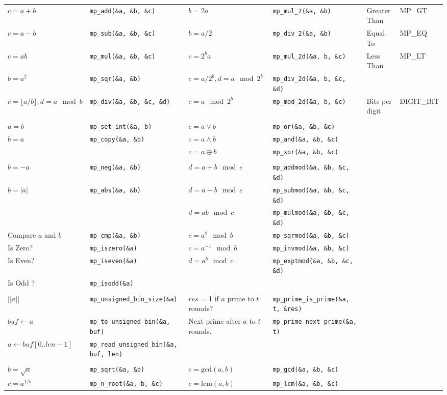 \documentclass[landscape,11pt]{article}
\begin{document}
\hspace*{-3in}
\begin{tabular}{llllll}
$c = a + b$  & {\tt mp\_add(\&a, \&b, \&c)} & $b = 2a$  & {\tt mp\_mul\_2(\&a, \&b)} & Greater Than & MP\_GT \\
$c = a - b$  & {\tt mp\_sub(\&a, \&b, \&c)} & $b = a/2$ & {\tt mp\_div\_2(\&a, \&b)} & Equal To & MP\_EQ \\
$c = ab $   & {\tt mp\_mul(\&a, \&b, \&c)}  & $c = 2^ba$  & {\tt mp\_mul\_2d(\&a, b, \&c)} & Less Than & MP\_LT \\
$b = a^2 $  & {\tt mp\_sqr(\&a, \&b)}       & $c = a/2^b, d = a \mod 2^b$ & {\tt mp\_div\_2d(\&a, b, \&c, \&d)} \\
$c = \lfloor a/b \rfloor, d = a \mod b$ & {\tt mp\_div(\&a, \&b, \&c, \&d)} & $c = a \mod 2^b $  & {\tt mp\_mod\_2d(\&a, b, \&c)}  & Bits per digit & DIGIT\_BIT \\
 && \\
$a = b $  & {\tt mp\_set\_int(\&a, b)}  & $c = a \vee b$  & {\tt mp\_or(\&a, \&b, \&c)}  \\
$b = a $  & {\tt mp\_copy(\&a, \&b)} & $c = a \wedge b$  & {\tt mp\_and(\&a, \&b, \&c)}  \\
 && $c = a \oplus b$  & {\tt mp\_xor(\&a, \&b, \&c)}  \\
 & \\
$b = -a $  & {\tt mp\_neg(\&a, \&b)}  & $d = a + b \mod c$  & {\tt mp\_addmod(\&a, \&b, \&c, \&d)}  \\
$b = |a| $  & {\tt mp\_abs(\&a, \&b)} & $d = a - b \mod c$  & {\tt mp\_submod(\&a, \&b, \&c, \&d)}  \\
 && $d = ab \mod c$  & {\tt mp\_mulmod(\&a, \&b, \&c, \&d)}  \\
Compare $a$ and $b$ & {\tt mp\_cmp(\&a, \&b)} & $c = a^2 \mod b$  & {\tt mp\_sqrmod(\&a, \&b, \&c)}  \\
Is Zero? & {\tt mp\_iszero(\&a)} & $c = a^{-1} \mod b$  & {\tt mp\_invmod(\&a, \&b, \&c)} \\
Is Even? & {\tt mp\_iseven(\&a)} & $d = a^b \mod c$ & {\tt mp\_exptmod(\&a, \&b, \&c, \&d)} \\
Is Odd ? & {\tt mp\_isodd(\&a)} \\
&\\
$\vert \vert a \vert \vert$ & {\tt mp\_unsigned\_bin\_size(\&a)} & $res$ = 1 if $a$ prime to $t$ rounds? & {\tt mp\_prime\_is\_prime(\&a, t, \&res)} \\
$buf \leftarrow a$          & {\tt mp\_to\_unsigned\_bin(\&a, buf)} & Next prime after $a$ to $t$ rounds. & {\tt mp\_prime\_next\_prime(\&a, t)} \\
$a \leftarrow buf[0..len-1]$          & {\tt mp\_read\_unsigned\_bin(\&a, buf, len)} \\
&\\
$b = \sqrt{a}$ & {\tt mp\_sqrt(\&a, \&b)}  & $c = \mbox{gcd}(a, b)$ & {\tt mp\_gcd(\&a, \&b, \&c)} \\
$c = a^{1/b}$ & {\tt mp\_n\_root(\&a, b, \&c)} & $c = \mbox{lcm}(a, b)$ & {\tt mp\_lcm(\&a, \&b, \&c)} \\
\end{tabular}
\end{document}
